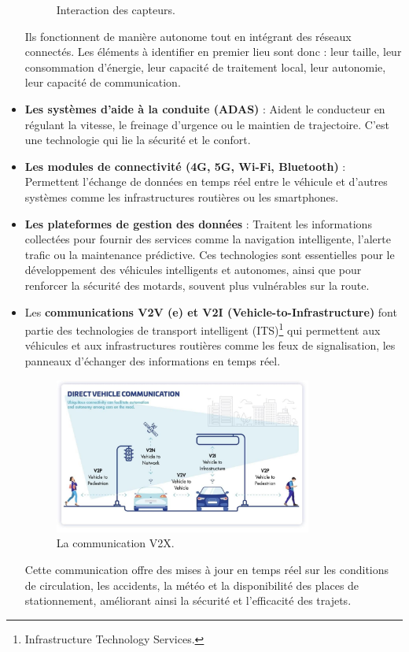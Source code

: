 \begin{itemize}
\begin{figure}[H]
        \caption{Interaction des capteurs.}
    \end{figure}
    Ils fonctionnent de manière autonome tout en intégrant des réseaux connectés. Les éléments à identifier en premier lieu sont donc : leur taille, leur consommation d’énergie, leur capacité de traitement local, leur autonomie, leur capacité de communication.
    \item \textbf{Les systèmes d’aide à la conduite (ADAS)} : Aident le conducteur en régulant la vitesse, le freinage d’urgence ou le maintien de trajectoire. C'est une technologie qui lie la sécurité et le confort.
    \item \textbf{Les modules de connectivité (4G, 5G, Wi-Fi, Bluetooth)} : Permettent l’échange de données en temps réel entre le véhicule et d’autres systèmes comme les infrastructures routières ou les smartphones.
    \item \textbf{Les plateformes de gestion des données} : Traitent les informations collectées pour fournir des services comme la navigation intelligente, l’alerte trafic ou la maintenance prédictive.
Ces technologies sont essentielles pour le développement des véhicules intelligents et autonomes, ainsi que pour renforcer la sécurité des motards, souvent plus vulnérables sur la route.
    \item Les \textbf{communications V2V (e) et V2I (Vehicle-to-Infrastructure)} font partie des technologies de transport intelligent (ITS)\footnote{Infrastructure Technology Services.} qui permettent aux véhicules et aux infrastructures routières comme les feux de signalisation, les panneaux d’échanger des informations en temps réel.

    \begin{figure}[H]
        \centering
        \includegraphics[width=0.8\textwidth]{images/schema_v2.png} 
        \caption{La communication V2X.}
    \end{figure}

    Cette communication offre des mises à jour en temps réel sur les conditions de circulation, les accidents, la météo et la disponibilité des places de stationnement, améliorant ainsi la sécurité et l’efficacité des trajets\cite{joberty_blog}.\\

\end{itemize}
\vspace{0.5cm}

